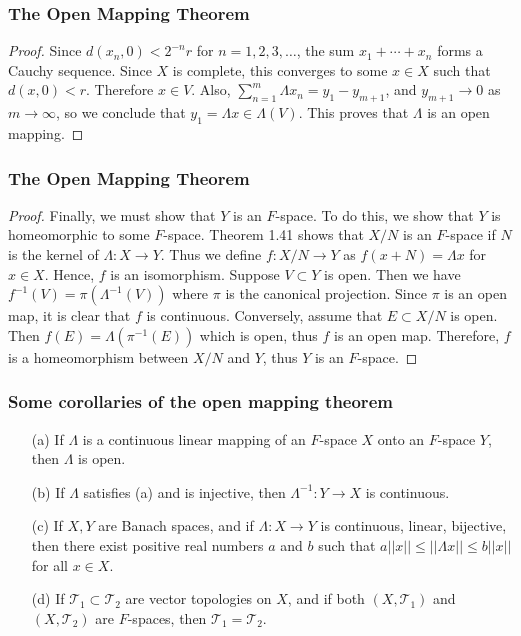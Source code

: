\documentclass{beamer}
\begin{document}
\begin{frame}
\frametitle{The Open Mapping Theorem}
\begin{proof}\renewcommand{\qedsymbol}{}
    Since $d(x_n,0) < 2^{-n}r$ for $n = 1,2,3,\ldots$, the sum $x_1 + \cdots + x_n$ forms a Cauchy sequence. Since $X$ is complete, this converges to some $x \in X$ such that $d(x,0) < r$. Therefore $x \in V$. Also, $\sum_{n=1}^m\Lambda x_n = y_1 - y_{m+1}$, and $y_{m+1} \to 0$ as $m \to \infty$, so we conclude that $y_1 = \Lambda x \in \Lambda(V)$. This proves that $\Lambda$ is an open mapping.
\end{proof}
\end{frame}
\begin{frame}
\frametitle{The Open Mapping Theorem}
\begin{proof}
    Finally, we must show that $Y$ is an $F$-space. To do this, we show that $Y$ is homeomorphic to some $F$-space. Theorem 1.41 shows that $X/N$ is an $F$-space if $N$ is the kernel of $\Lambda: X \to Y$. Thus we define $f: X/N \to Y$ as $f(x+N) = \Lambda x$ for $x \in X$. Hence, $f$ is an isomorphism. Suppose $V\subset Y$ is open. Then we have $f^{-1}(V) = \pi(\Lambda^{-1}(V))$ where $\pi$ is the canonical projection. Since $\pi$ is an open map, it is clear that $f$ is continuous. Conversely, assume that $E \subset X/N$ is open. Then $f(E) = \Lambda(\pi^{-1}(E))$ which is open, thus $f$ is an open map. Therefore, $f$ is a homeomorphism between $X/N$ and $Y$, thus $Y$ is an $F$-space.
\end{proof}
\end{frame}
\begin{frame}
\frametitle{Some corollaries of the open mapping theorem}
\begin{corollary}
    \begin{itemize}
        \item[(a)] If $\Lambda$ is a continuous linear mapping of an $F$-space $X$ onto an $F$-space $Y$, then $\Lambda$ is open.
        \item[(b)] If $\Lambda$ satisfies (a) and is injective, then $\Lambda^{-1} : Y \to X$ is continuous.
        \item[(c)] If $X,Y$ are Banach spaces, and if $\Lambda: X \to Y$ is continuous, linear, bijective, then there exist positive real numbers $a$ and $b$ such that $a||x|| \leq ||\Lambda x|| \leq b||x||$ for all $x\in X$.
        \item[(d)] If $\mathcal{T}_1 \subset \mathcal{T}_2$ are vector topologies on $X$, and if both $(X,\mathcal{T}_1)$ and $(X,\mathcal{T}_2)$ are $F$-spaces, then $\mathcal{T}_1 = \mathcal{T}_2$.
    \end{itemize}
\end{corollary}
\end{frame}
\end{document}
